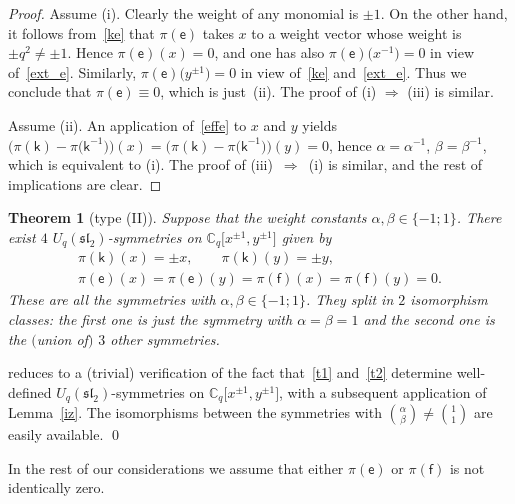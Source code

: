 \documentclass[10pt,a4paper]{amsart}
\numberwithin{equation}{section}
\newtheorem{Theorem}{Theorem}[section]
\begin{document}
\begin{proof} Assume (i). Clearly the weight of any monomial is $\pm 1$. On the other hand, it follows from~\eqref{ke} that $\pi(\mathsf{e})$ takes $x$ to a weight vector whose weight is $\pm q^2\ne\pm 1$. Hence $\pi(\mathsf{e})(x)=0$, and one has also $\pi(\mathsf{e})\big(x^{-1}\big)=0$ in view of~\eqref{ext_e}. Similarly, $\pi(\mathsf{e})\big(y^{\pm 1}\big)=0$ in view of~\eqref{ke} and~\eqref{ext_e}. Thus we conclude that $\pi(\mathsf{e})\equiv 0$, which is just~(ii). The proof of (i) $\Rightarrow$ (iii) is similar.

Assume (ii). An application of~\eqref{effe} to $x$ and $y$ yields $\big(\pi(\mathsf{k})-\pi\big(\mathsf{k}^{-1}\big)\big)(x)=
\big(\pi(\mathsf{k})-\pi\big(\mathsf{k}^{-1}\big)\big)(y)=0$, hence $\alpha=\alpha^{-1}$, $\beta=\beta^{-1}$, which is equivalent to (i). The proof of (iii)~$\Rightarrow$~(i) is similar, and the rest of implications are clear. \end{proof}

\begin{Theorem}[type (II)]\label{T01}
Suppose that the weight constants $\alpha,\beta\in\{-1;1\}$. There exist $4$ $U_q(\mathfrak{sl}_2)$-symmetries on $\mathbb{C}_q\big[x^{\pm 1},y^{\pm 1}\big]$ given by
\begin{gather}
\pi(\mathsf{k})(x) =\pm x,\qquad\pi(\mathsf{k})(y)=\pm y, \label{t1}\\
\pi(\mathsf{e})(x) =\pi(\mathsf{e})(y)=\pi(\mathsf{f})(x)=\pi(\mathsf{f})(y)=0. \label{t2}
\end{gather}
These are all the symmetries with $\alpha,\beta\in\{-1;1\}$. They split in $2$ isomorphism classes: the first one is just the symmetry with $\alpha=\beta=1$ and the second one is the $($union of$)$ $3$ other symmetries.
\end{Theorem}

 reduces to a (trivial) verification of the fact that~\eqref{t1} and~\eqref{t2} determine well-defined $U_q(\mathfrak{sl}_2)$-symmetries on $\mathbb{C}_q\big[x^{\pm 1},y^{\pm 1}\big]$, with a subsequent application of Lemma~\ref{iz}. The isomorphisms between the symmetries with $\binom{\alpha}{\beta}\ne\binom{1}{1}$ are easily available.
\hfill \qed

\medskip

In the rest of our considerations we assume that either $\pi(\mathsf{e})$ or $\pi(\mathsf{f})$ is not identically zero.
\end{document}
